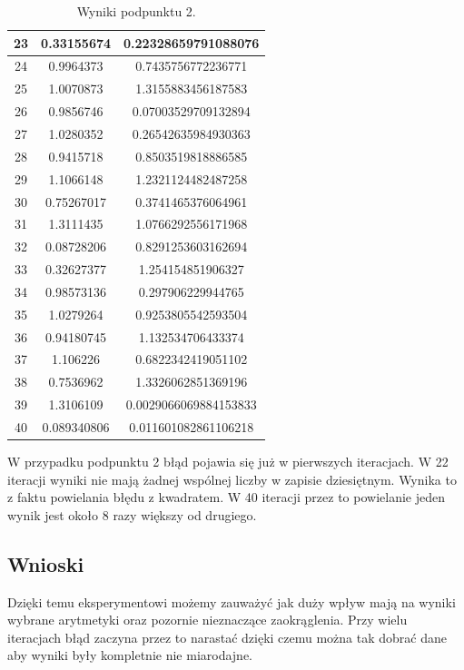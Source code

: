 \documentclass{article}
\begin{document}
\begin{table}[H]
\begin{tabular}{|c|c|c|}
23         & 0.33155674        & 0.22328659791088076       \\ \hline
24         & 0.9964373         & 0.7435756772236771        \\ \hline
25         & 1.0070873         & 1.3155883456187583        \\ \hline
26         & 0.9856746         & 0.07003529709132894       \\ \hline
27         & 1.0280352         & 0.26542635984930363       \\ \hline
28         & 0.9415718         & 0.8503519818886585        \\ \hline
29         & 1.1066148         & 1.2321124482487258        \\ \hline
30         & 0.75267017        & 0.3741465376064961        \\ \hline
31         & 1.3111435         & 1.0766292556171968        \\ \hline
32         & 0.08728206        & 0.8291253603162694        \\ \hline
33         & 0.32627377        & 1.254154851906327         \\ \hline
34         & 0.98573136        & 0.297906229944765         \\ \hline
35         & 1.0279264         & 0.9253805542593504        \\ \hline
36         & 0.94180745        & 1.132534706433374         \\ \hline
37         & 1.106226          & 0.6822342419051102        \\ \hline
38         & 0.7536962         & 1.3326062851369196        \\ \hline
39         & 1.3106109         & 0.0029066069884153833     \\ \hline
40         & 0.089340806       & 0.011601082861106218      \\ \hline
\end{tabular}
\caption{Wyniki podpunktu 2.}
\label{tab:values_precise}
\end{table}
W przypadku podpunktu 2 błąd pojawia się już w pierwszych iteracjach. W 22 iteracji wyniki nie mają żadnej wspólnej liczby w zapisie dziesiętnym. Wynika to z faktu powielania błędu z  kwadratem. W 40 iteracji przez to powielanie jeden wynik jest około 8 razy większy od drugiego.
\subsection*{Wnioski}
Dzięki temu eksperymentowi możemy zauważyć jak duży wpływ mają na wyniki wybrane arytmetyki oraz pozornie nieznaczące zaokrąglenia. Przy wielu iteracjach błąd zaczyna przez to narastać dzięki czemu można tak dobrać dane aby wyniki były kompletnie nie miarodajne. 
\end{document}
